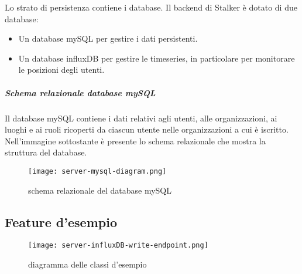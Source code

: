\documentclass[../manuale-manutentore.tex]{subfiles}
\begin{document}
Lo strato di persistenza contiene i database. Il backend di Stalker è dotato di due database:
\begin{itemize}
  \item Un database mySQL per gestire i dati persistenti.
  \item Un database influxDB per gestire le timeseries, in particolare per monitorare le posizioni degli utenti.
\end{itemize}

\subparagraph{Schema relazionale database mySQL}%
\label{subp:schema_relazionale_database_mysql}
Il database mySQL contiene i dati relativi agli utenti, alle organizzazioni, ai luoghi e ai ruoli ricoperti da ciascun utente nelle organizzazioni a cui è iscritto.
Nell'immagine sottostante è presente lo schema relazionale che mostra la struttura del database.
\begin{figure}[H]
  \centering
  \texttt{[image: server-mysql-diagram.png]}
  \caption{schema relazionale del database mySQL}%
   \label{fig: schema relazionale del database mySQL}
\end{figure}

\subsection{Feature d'esempio}%
\label{sub:feature_d'esempio}

  \begin{figure}[H]
    \centering
    \texttt{[image: server-influxDB-write-endpoint.png]}
    \caption{diagramma delle classi d'esempio}%
     \label{fig: diagramma delle classi d'esempio}
  \end{figure}
\end{document}
